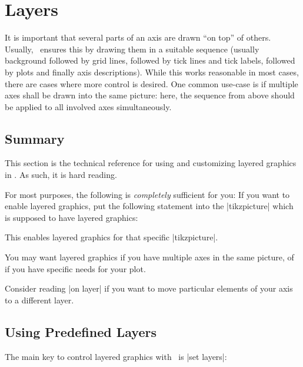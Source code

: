 \section{Layers}
{
%

It is important that several parts of an axis are drawn ``on top'' of others. Usually, \PGFPlots\ ensures this by drawing them in a suitable sequence (usually background followed by grid lines, followed by tick lines and tick labels, followed by plots and finally axis descriptions). While this works reasonable in most cases, there are cases where more control is desired. One common use-case is if multiple axes shall be drawn into the same picture: here, the sequence from above should be applied to all involved axes simultaneously. 

\subsection{Summary}
This section is the technical reference for using and customizing layered graphics in \PGFPlots. As such, it is hard reading.

For most purposes, the following is \emph{completely} sufficient for you: If you want to enable layered graphics, put the following statement into the |tikzpicture| which is supposed to have layered graphics:

\begin{codeexample}
\end{codeexample}
\noindent This enables layered graphics for that specific |tikzpicture|. 

You may want layered graphics if you have multiple axes in the same picture, of if you have specific needs for your plot.

Consider reading |on layer| if you want to move particular elements of your axis to a different layer.


\subsection{Using Predefined Layers}
The main key to control layered graphics with \PGFPlots\ is |set layers|:

}

